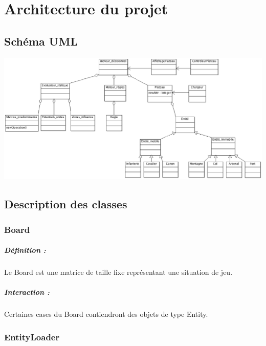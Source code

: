 \chapter{Architecture du projet}

	\section{Schéma UML}

		\includegraphics[scale=0.4]{images/diag_classes.eps}

		\clearpage

	\section{Description des classes}

		\subsection*{Board}
		
			\paragraph{Définition :}
			Le Board est une matrice de taille fixe représentant une situation de jeu.
			\paragraph{Interaction :}
			Certaines cases du Board contiendront des objets de type Entity.
			

		\subsection*{EntityLoader}


